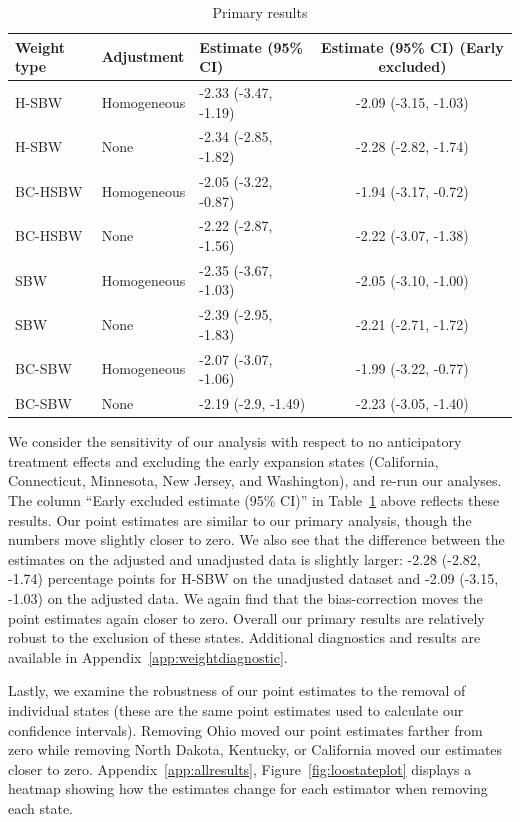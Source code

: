 \documentclass[aoas]{imsart}
\theoremstyle{plain}
\theoremstyle{remark}
\begin{document}
\begin{table}[ht]
\caption{Primary results}\label{tab:mainresults}
\begin{tabular}{lllc}
  \hline
Weight type & Adjustment & Estimate (95\% CI) & Estimate (95\% CI) (Early excluded) \\ 
  \hline
H-SBW & Homogeneous & -2.33 (-3.47, -1.19) & -2.09 (-3.15, -1.03) \\ 
  H-SBW & None & -2.34 (-2.85, -1.82) & -2.28 (-2.82, -1.74) \\ 
  BC-HSBW & Homogeneous & -2.05 (-3.22, -0.87) & -1.94 (-3.17, -0.72) \\ 
  BC-HSBW & None & -2.22 (-2.87, -1.56) & -2.22 (-3.07, -1.38) \\ 
  SBW & Homogeneous & -2.35 (-3.67, -1.03) & -2.05 (-3.10, -1.00) \\ 
  SBW & None & -2.39 (-2.95, -1.83) & -2.21 (-2.71, -1.72) \\ 
  BC-SBW & Homogeneous & -2.07 (-3.07, -1.06) & -1.99 (-3.22, -0.77) \\ 
  BC-SBW & None & -2.19 (-2.9, -1.49) & -2.23 (-3.05, -1.40) \\ 
   \hline
\end{tabular}
\end{table}

We consider the sensitivity of our analysis with respect to no anticipatory treatment effects and excluding the early expansion states (California, Connecticut, Minnesota, New Jersey, and Washington), and re-run our analyses. The column ``Early excluded estimate (95\% CI)'' in Table~\ref{tab:mainresults} above reflects these results. Our point estimates are similar to our primary analysis, though the numbers move slightly closer to zero. We also see that the difference between the estimates on the adjusted and unadjusted data is slightly larger: -2.28 (-2.82, -1.74) percentage points for H-SBW on the unadjusted dataset and -2.09 (-3.15, -1.03) on the adjusted data. We again find that the bias-correction moves the point estimates again closer to zero. Overall our primary results are relatively robust to the exclusion of these states. Additional diagnostics and results are available in Appendix~\ref{app:weightdiagnostic}.

Lastly, we examine the robustness of our point estimates to the removal of individual states (these are the same point estimates used to calculate our confidence intervals). Removing Ohio moved our point estimates farther from zero while removing North Dakota, Kentucky, or California moved our estimates closer to zero. Appendix~\ref{app:allresults}, Figure~\ref{fig:loostateplot} displays a heatmap showing how the estimates change for each estimator when removing each state.
\end{document}
